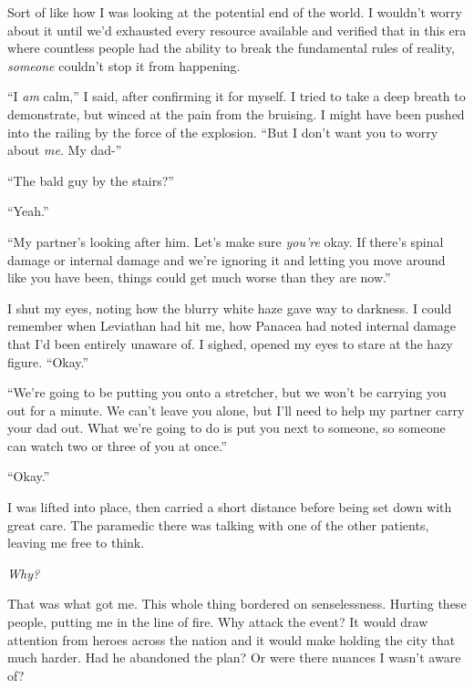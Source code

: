 Sort of like how I was looking at the potential end of the world.  I wouldn't worry about it until we'd exhausted every resource available and verified that in this era where countless people had the ability to break the fundamental rules of reality, \emph{someone} couldn't stop it from happening.



``I \emph{am} calm,'' I said, after confirming it for myself.  I tried to take a deep breath to demonstrate, but winced at the pain from the bruising.  I might have been pushed into the railing by the force of the explosion.  ``But I don't want you to worry about \emph{me}.  My dad-''



``The bald guy by the stairs?''



``Yeah.''



``My partner's looking after him.  Let's make sure \emph{you're} okay.  If there's spinal damage or internal damage and we're ignoring it and letting you move around like you have been, things could get much worse than they are now.''



I shut my eyes, noting how the blurry white haze gave way to darkness.  I could remember when Leviathan had hit me, how Panacea had noted internal damage that I'd been entirely unaware of.  I sighed, opened my eyes to stare at the hazy figure.  ``Okay.''



``We're going to be putting you onto a stretcher, but we won't be carrying you out for a minute.  We can't leave you alone, but I'll need to help my partner carry your dad out.  What we're going to do is put you next to someone, so someone can watch two or three of you at once.''



``Okay.''



I was lifted into place, then carried a short distance before being set down with great care.  The paramedic there was talking with one of the other patients, leaving me free to think.



\emph{Why?}



That was what got me.  This whole thing bordered on senselessness.  Hurting these people, putting me in the line of fire.  Why attack the event?  It would draw attention from heroes across the nation and it would make holding the city that much harder.  Had he abandoned the plan?  Or were there nuances I wasn't aware of?



